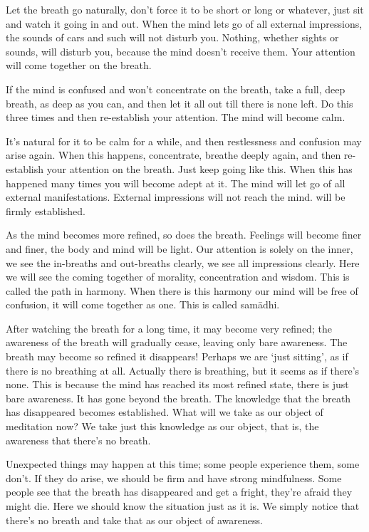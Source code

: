 Let the breath go naturally, don't force it to be short or long or whatever, just sit and watch it going in and out. When the mind lets go of all external impressions, the sounds of cars and such will not disturb you. Nothing, whether sights or sounds, will disturb you, because the mind doesn't receive them. Your attention will come together on the breath. 

If the mind is confused and won't concentrate on the breath, take a full, deep breath, as deep as you can, and then let it all out till there is none left. Do this three times and then re-establish your attention. The mind will become calm. 

It's natural for it to be calm for a while, and then restlessness and confusion may arise again. When this happens, concentrate, breathe deeply again, and then re-establish your attention on the breath. Just keep going like this. When this has happened many times you will become adept at it. The mind will let go of all external manifestations. External impressions will not reach the mind.  will be firmly established. 

As the mind becomes more refined, so does the breath. Feelings will become finer and finer, the body and mind will be light. Our attention is solely on the inner, we see the in-breaths and out-breaths clearly, we see all impressions clearly. Here we will see the coming together of morality, concentration and wisdom. This is called the path in harmony. When there is this harmony our mind will be free of confusion, it will come together as one. This is called sam\=adhi. 

After watching the breath for a long time, it may become very refined; the awareness of the breath will gradually cease, leaving only bare awareness. The breath may become so refined it disappears! Perhaps we are `just sitting', as if there is no breathing at all. Actually there is breathing, but it seems as if there's none. This is because the mind has reached its most refined state, there is just bare awareness. It has gone beyond the breath. The knowledge that the breath has disappeared becomes established. What will we take as our object of meditation now? We take just this knowledge as our object, that is, the awareness that there's no breath. 

Unexpected things may happen at this time; some people experience them, some don't. If they do arise, we should be firm and have strong mindfulness. Some people see that the breath has disappeared and get a fright, they're afraid they might die. Here we should know the situation just as it is. We simply notice that there's no breath and take that as our object of awareness. 

